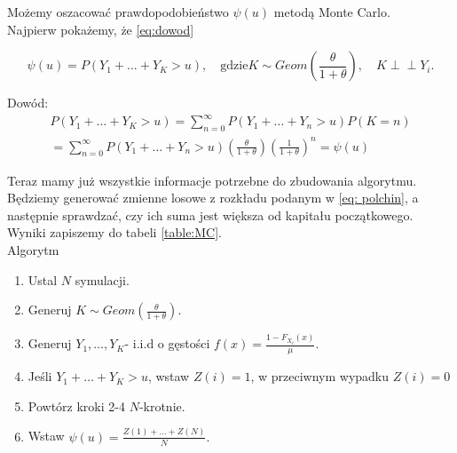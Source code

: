 \documentclass{article}
\theoremstyle{break}
\newcommand{\indep}{\perp \!\!\! \perp}
\numberwithin{equation}{subsection}
\numberwithin{figure}{section}
\begin{document}
Możemy oszacować prawdopodobieństwo $\psi(u)$ metodą Monte Carlo. \\
Najpierw pokażemy, że \eqref{eq:dowod}

\begin{equation}
\psi(u)=P(Y_1+\dots+Y_K>u),\quad \mathrm{gdzie} K\sim Geom(\frac{\theta}{1+\theta}), \quad K\indep Y_i. \label{eq:dowod}
\end{equation}

Dowód:
\begin{gather}
	P(Y_1+\dots+Y_K>u)=\sum\limits_{n=0}^{\infty}P(Y_1+\dots+Y_n>u)P(K=n)\\= \sum\limits_{n=0}^{\infty}P(Y_1+\dots+Y_n>u)(\frac{\theta}{1+\theta})(\frac{1}{1+\theta})^{n}=\psi(u)
\end{gather}

Teraz mamy już wszystkie informacje potrzebne do zbudowania algorytmu. Będziemy generować zmienne losowe z rozkładu podanym w \eqref{eq: polchin}, a następnie sprawdzać, czy ich suma jest większa od kapitału początkowego. Wyniki zapiszemy do tabeli \ref{table:MC}.\\

Algorytm\\
\begin{enumerate}
	\item Ustal $N$ symulacji.
	\item Generuj $K\sim Geom(\frac{\theta}{1+\theta})$.
	\item Generuj $Y_1,\dots,Y_K$- i.i.d o gęstości  $f(x)=\frac{1-F_{X_i}(x)}{\mu}$.
	\item Jeśli $Y_1+\dots+Y_K>u$, wstaw $Z(i)=1$, w przeciwnym wypadku $Z(i)=0$
	\item Powtórz kroki 2-4 $N$-krotnie.
	\item Wstaw $\psi(u)=\frac{Z(1)+\dots+Z(N)}{N}.$
\end{enumerate}
\end{document}
